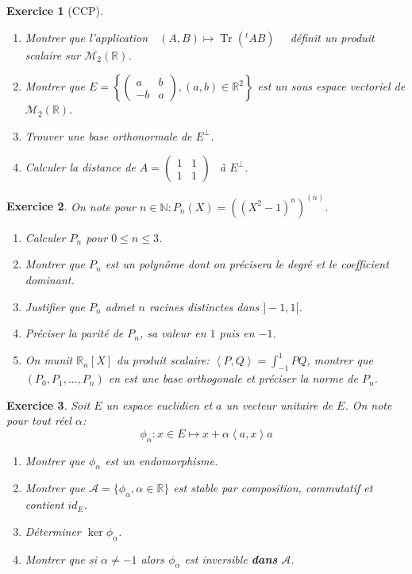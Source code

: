 \documentclass[12pt,a4paper]{article}
\newcommand{\ps}[2]{\left\langle#1,#2\right\rangle}
\newcommand{\R}{\mathbb{R}}
\newcommand{\N}{\mathbb{N}}
\theoremstyle{break}
\newtheorem{Exo}{Exercice}
\begin{document}
\begin{Exo}[CCP]\ 
	\begin{enumerate}
	\item Montrer que l'application$ \quad (A,B) \mapsto \operatorname{Tr} ( ^t\!A B) \quad $ définit un produit scalaire sur $\mathcal{M}_2(\mathbb R) $.
	\item Montrer que $E=\left\{\begin{pmatrix} a & b \\ -b & a \end{pmatrix},(a,b)\in \mathbb{R}^2\right\}$ est un sous espace vectoriel de $\mathcal{M}_2(\mathbb{R}) $. 
	\item Trouver une base orthonormale de $E^\perp$.
	\item Calculer la distance de $A=  \begin{pmatrix}1 & 1\\1&1\end{pmatrix} \ \ $ à $E^\perp$.
		\end{enumerate}
\end{Exo}

\begin{Exo}
On note pour $n\in \N:P_n(X)=((X^2-1)^n)^{(n)}$.
\begin{enumerate}
\item
Calculer $P_n$ pour $0\leqslant n  \leqslant 3$.
\item
Montrer que $P_n$ est un polynôme dont on précisera le degré et le coefficient dominant.
\item
Justifier que $P_n$ admet $n$ racines distinctes dans $]-1,1[$.
\item
Préciser la parité de $P_n$, sa valeur en $1$ puis en $-1$.
\item
On munit $\R_n[X]$ du produit scalaire: $\ps{P}{Q}=\int_{-1}^1PQ$, montrer que $(P_0,P_1,...,P_n)$ en est une base orthogonale et préciser la norme de $P_n$.
\end{enumerate}
\end{Exo}

\begin{Exo}
Soit $E$ un espace euclidien et $a$ un vecteur unitaire de $E$. On note pour tout réel $\alpha$:
$$\phi_{\alpha}:x\in E\mapsto x+\alpha \ps{a}{x}a$$
\begin{enumerate}
\item
Montrer que $\phi_{\alpha}$ est un endomorphisme.
\item
Montrer que $\mathcal{A}=\{\phi_{\alpha},\alpha\in \R\}$ est stable par composition, commutatif et contient $id_E$.
\item Déterminer $\ker \phi_{\alpha}$.
\item Montrer que si $\alpha\neq -1$ alors $\phi_{\alpha}$ est inversible \textbf{dans} $\mathcal{A}$.
\end{enumerate}
\end{Exo}
\end{document}
